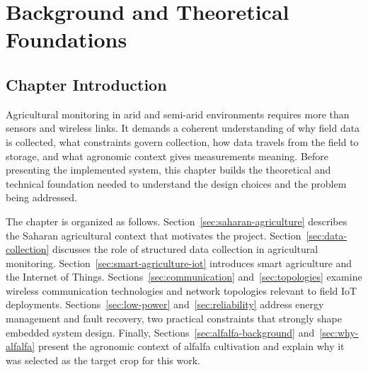 
\chapter{Background and Theoretical Foundations}
\label{chap:background}

\section{Chapter Introduction}
\label{sec:ch1-intro}

Agricultural monitoring in arid and semi-arid environments requires more than
sensors and wireless links. It demands a coherent understanding of why field data
is collected, what constraints govern collection, how data travels from the field
to storage, and what agronomic context gives measurements meaning. Before
presenting the implemented system, this chapter builds the theoretical and
technical foundation needed to understand the design choices and the problem being
addressed.

The chapter is organized as follows. Section~\ref{sec:saharan-agriculture}
describes the Saharan agricultural context that motivates the project.
Section~\ref{sec:data-collection} discusses the role of structured data collection
in agricultural monitoring. Section~\ref{sec:smart-agriculture-iot} introduces
smart agriculture and the Internet of Things. Sections~\ref{sec:communication}
and~\ref{sec:topologies} examine wireless communication technologies and network
topologies relevant to field IoT deployments. Sections~\ref{sec:low-power}
and~\ref{sec:reliability} address energy management and fault recovery, two
practical constraints that strongly shape embedded system design. Finally,
Sections~\ref{sec:alfalfa-background} and~\ref{sec:why-alfalfa} present the
agronomic context of alfalfa cultivation and explain why it was selected as the
target crop for this work.

